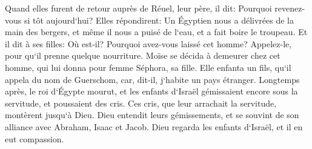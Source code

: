 \verse Quand elles furent de retour auprès de Réuel, leur père, il dit: Pourquoi revenez-vous si tôt aujourd`hui? 
\verse Elles répondirent: Un Égyptien nous a délivrées de la main des bergers, et même il nous a puisé de l`eau, et a fait boire le troupeau. 
\verse Et il dit à ses filles: Où est-il? Pourquoi avez-vous laissé cet homme? Appelez-le, pour qu`il prenne quelque nourriture. 
\verse Moïse se décida à demeurer chez cet homme, qui lui donna pour femme Séphora, sa fille. 
\verse Elle enfanta un fils, qu`il appela du nom de Guerschom, car, dit-il, j`habite un pays étranger. 
\verse Longtemps après, le roi d`Égypte mourut, et les enfants d`Israël gémissaient encore sous la servitude, et poussaient des cris. Ces cris, que leur arrachait la servitude, montèrent jusqu`à Dieu. 
\verse Dieu entendit leurs gémissements, et se souvint de son alliance avec Abraham, Isaac et Jacob. 
\verse Dieu regarda les enfants d`Israël, et il en eut compassion. 

